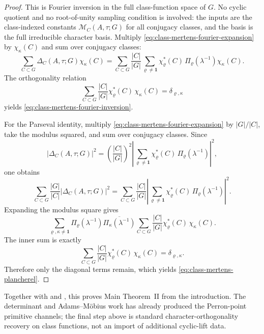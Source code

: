 \documentclass[11pt,a4paper]{amsart}
\theoremstyle{plain}
\theoremstyle{definition}
\theoremstyle{remark}
\begin{document}
\begin{proof}
  This is Fourier inversion in the full class-function space of \(G\).
  No cyclic quotient and no root-of-unity sampling condition is involved:
  the inputs are the class-indexed constants
  \(\mathcal M_C(A,\tau;G)\) for all conjugacy classes, and the basis is
  the full irreducible character basis.
  Multiply \eqref{eq:class-mertens-fourier-expansion} by
  \(\chi_\kappa(C)\) and sum over conjugacy classes:
  \[
    \sum_{C\subset G}\Delta_C(A,\tau;G)\chi_\kappa(C)
    =
    \sum_{C\subset G}\frac{|C|}{|G|}
      \sum_{\varrho\neq\mathbf 1}
        \chi_\varrho^\ast(C)\,
        \Pi_\varrho(\lambda^{-1})\chi_\kappa(C).
  \]
  The orthogonality relation
  \[
    \sum_{C\subset G}\frac{|C|}{|G|}
      \chi_\varrho^\ast(C)\,\chi_\kappa(C)
    =\delta_{\varrho,\kappa}
  \]
  yields \eqref{eq:class-mertens-fourier-inversion}.

  For the Parseval identity, multiply
  \eqref{eq:class-mertens-fourier-expansion} by \(|G|/|C|\), take the
  modulus squared, and sum over conjugacy classes. Since
  \[
    |\Delta_C(A,\tau;G)|^2
    =
    \left(\frac{|C|}{|G|}\right)^2
    \left|\sum_{\varrho\neq\mathbf 1}
      \chi_\varrho^\ast(C)\,
      \Pi_\varrho(\lambda^{-1})\right|^2,
  \]
  one obtains
  \[
    \sum_{C\subset G}\frac{|G|}{|C|}|\Delta_C(A,\tau;G)|^2
    =
    \sum_{C\subset G}\frac{|C|}{|G|}
      \left|\sum_{\varrho\neq\mathbf 1}
        \chi_\varrho^\ast(C)\,
        \Pi_\varrho(\lambda^{-1})\right|^2.
  \]
  Expanding the modulus square gives
  \[
    \sum_{\varrho,\kappa\neq\mathbf 1}
      \Pi_\varrho(\lambda^{-1})
      \overline{\Pi_\kappa(\lambda^{-1})}
      \sum_{C\subset G}\frac{|C|}{|G|}
        \chi_\varrho^\ast(C)\,\chi_\kappa(C).
  \]
  The inner sum is exactly
  \[
    \sum_{C\subset G}\frac{|C|}{|G|}
      \chi_\varrho^\ast(C)\,\chi_\kappa(C)
    =\delta_{\varrho,\kappa}.
  \]
  Therefore only the diagonal terms remain, which
  yields \eqref{eq:class-mertens-plancherel}.
\end{proof}

\noindent
Together with  and
, this proves Main Theorem~II from
the introduction. The determinant and Adams--M\"obius work has already
produced the Perron-point primitive channels; the final step above is
standard character-orthogonality recovery on class functions, not an import of
additional cyclic-lift data.
\end{document}
